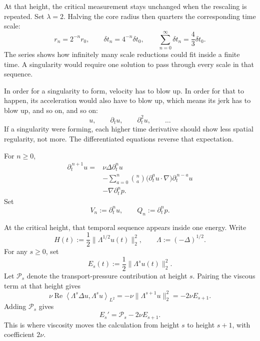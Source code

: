 \documentclass[12pt]{article}
\begin{document}
At that height, the critical measurement stays unchanged when the rescaling is
repeated. Set \(\lambda=2\). Halving the core radius then quarters the
corresponding time scale:
\[
  r_n=2^{-n}r_0,
  \qquad
  \delta t_n=4^{-n}\delta t_0,
  \qquad
  \sum_{n=0}^{\infty}\delta t_n
  =
  \frac43\delta t_0.
\]
The series shows how infinitely many scale reductions could fit inside a finite
time. A singularity would require one solution to pass through every scale in
that sequence.

In order for a singularity to form, velocity has to blow up. In order for
that to happen, its acceleration would also have to blow up, which means its
jerk has to blow up, and so on, and so on:
\[
  u,
  \qquad
  \partial_tu,
  \qquad
  \partial_t^2u,
  \qquad
  \ldots
\]
If a singularity were forming, each higher time derivative should show less
spatial regularity, not more. The differentiated equations reverse that
expectation.

\begingroup
\setlength{\abovedisplayskip}{17pt}
\setlength{\belowdisplayskip}{17pt}
\begin{flushleft}
\end{flushleft}
\endgroup

For \(n\geq0\),
\[
\begin{aligned}
  \partial_t^{\,n+1}u
  ={}&
  \nu\Delta\partial_t^nu
  \\
  &-
  \sum_{a=0}^{n}
  \binom{n}{a}
  \bigl(\partial_t^au\cdot\nabla\bigr)
  \partial_t^{\,n-a}u
  \\
  &-
  \nabla\partial_t^np.
\end{aligned}
\]
Set
\[
  V_n:=\partial_t^nu,
  \qquad
  Q_n:=\partial_t^np.
\]

At the critical height, that temporal sequence appears inside one energy. Write
\[
  H(t)
  :=
  \frac12\|\Lambda^{1/2}u(t)\|_2^2,
  \qquad
  \Lambda:=(-\Delta)^{1/2}.
\]
For any \(s\geq0\), set
\[
  E_s(t)
  :=
  \frac12\|\Lambda^su(t)\|_2^2.
\]
Let \(\mathcal P_s\) denote the transport-pressure contribution at height
\(s\). Pairing the viscous term at that height gives
\[
  \nu\operatorname{Re}
  \left\langle
    \Lambda^s\Delta u,
    \Lambda^su
  \right\rangle_{L^2}
  =
  -\nu\|\Lambda^{s+1}u\|_2^2
  =
  -2\nu E_{s+1}.
\]
Adding \(\mathcal P_s\) gives
\[
  E_s'
  =
  \mathcal P_s
  -
  2\nu E_{s+1}.
\]
This is where viscosity moves the calculation from height \(s\) to height
\(s+1\), with coefficient \(2\nu\).
\end{document}
